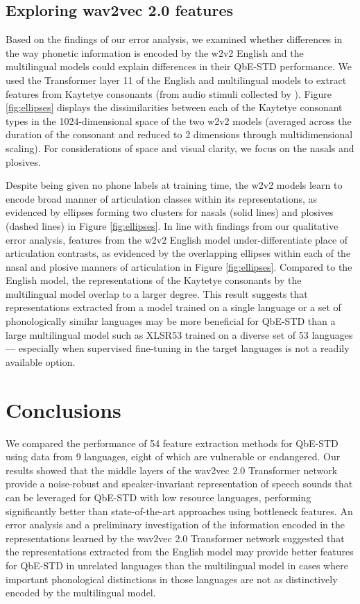 \documentclass{article}
\begin{document}
\subsection{Exploring wav2vec 2.0 features}

Based on the findings of our error analysis, we examined whether differences in the way phonetic information is encoded by the w2v2 English and the multilingual models could explain differences in their QbE-STD performance.
We used the Transformer layer 11 of the English and multilingual models to extract features from Kaytetye consonants (from audio stimuli collected by \cite{harvey2015contrastive}).
Figure \ref{fig:ellipses} displays the dissimilarities between each of the Kaytetye consonant types in the 1024-dimensional space of the two w2v2 models (averaged across the duration of the consonant and reduced to 2 dimensions through multidimensional scaling).
For considerations of space and visual clarity, we focus on the nasals and plosives.

Despite being given no phone labels at training time, the w2v2 models learn to encode broad manner of articulation classes within its representations, as evidenced by ellipses forming two clusters for nasals (solid lines) and plosives (dashed lines) in Figure \ref{fig:ellipses}.
In line with findings from our qualitative error analysis, features from the w2v2 English model under-differentiate place of articulation contrasts, as evidenced by the overlapping ellipses within each of the nasal and plosive manners of articulation in Figure \ref{fig:ellipses}. 
Compared to the English model, the representations of the Kaytetye consonants by the multilingual model overlap to a larger degree.
This result suggests that representations extracted from a model trained on a single language or a set of phonologically similar languages may be more beneficial for QbE-STD than a large multilingual model such as XLSR53 trained on a diverse set of 53 languages --- especially when supervised fine-tuning in the target languages is not a readily available option.

\section{Conclusions}

We compared the performance of 54 feature extraction methods for QbE-STD using data from 9 languages, eight of which are vulnerable or endangered.
Our results showed that the middle layers of the wav2vec 2.0 Transformer network provide a noise-robust and speaker-invariant representation of speech sounds that can be leveraged for QbE-STD with low resource languages, performing significantly better than state-of-the-art approaches using bottleneck features.
An error analysis and a preliminary investigation of the information encoded in the representations learned by the wav2vec 2.0 Transformer network suggested that the representations extracted from the English model may provide better features for QbE-STD in unrelated languages than the multilingual model in cases where important phonological distinctions in those languages are not as distinctively encoded by the multilingual model.
\end{document}
